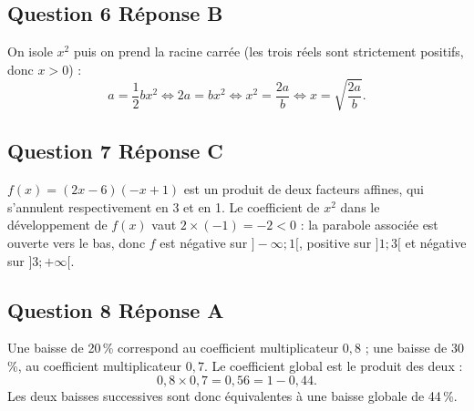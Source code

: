 \subsection*{Question 6 \quad Réponse B}

On isole $x^2$ puis on prend la racine carrée (les trois réels sont strictement positifs,
donc $x > 0$) :
\[a = \dfrac{1}{2}bx^2 \iff 2a = bx^2 \iff x^2 = \dfrac{2a}{b} \iff x = \sqrt{\dfrac{2a}{b}}.\]

\subsection*{Question 7 \quad Réponse C}

$f(x) = (2x-6)(-x+1)$ est un produit de deux facteurs affines, qui s'annulent respectivement
en 3 et en 1. Le coefficient de $x^2$ dans le développement de $f(x)$ vaut
$2 \times (-1) = -2 < 0$ : la parabole associée est ouverte vers le bas, donc $f$ est
négative sur $]-\infty ; 1[$, positive sur $]1 ; 3[$ et négative sur $]3 ; +\infty[$.

\subsection*{Question 8 \quad Réponse A}

Une baisse de 20\,\% correspond au coefficient multiplicateur $0,8$ ; une baisse de
30\,\%, au coefficient multiplicateur $0,7$. Le coefficient global est le produit
des deux :
\[0,8 \times 0,7 = 0,56 = 1 - 0,44.\]
Les deux baisses successives sont donc équivalentes à une baisse globale de 44\,\%.
